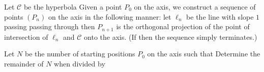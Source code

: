 Let $ \mathcal{C}$ be the hyperbola   Given a point $ P_0$ on the axis, we construct a sequence of points $ (P_n)$ on the axis in the following manner: let $ \ell_n$ be the line with slope $ 1$ passing passing through  then $ P_{n+1}$ is the orthogonal projection of the point of intersection of $ \ell_n$ and $ \mathcal C$ onto the axis. (If  then the sequence simply terminates.)

Let $ N$ be the number of starting positions $ P_0$ on the axis such that  Determine the remainder of $ N$ when divided by 